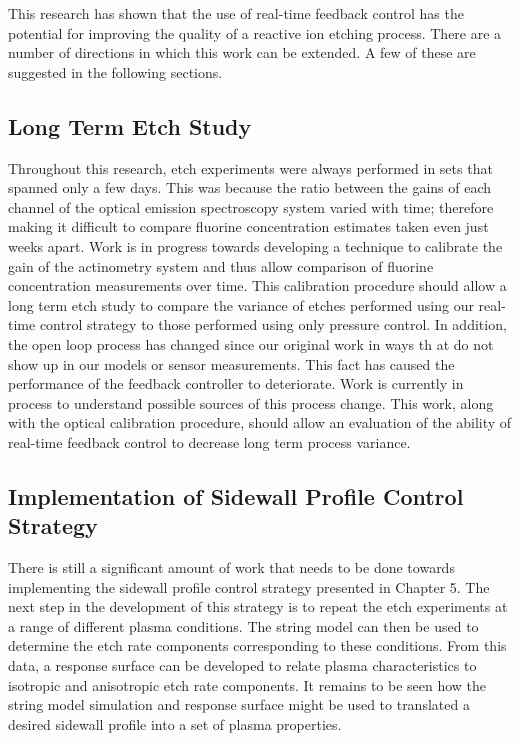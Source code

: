 \tab This research has shown that the use of real-time feedback control has the potential for
improving the quality of a reactive ion etching process. There are a number of directions
in which this work can be extended. A few of these are suggested in the following sections.

\subsection{Long Term Etch Study}

\tab Throughout this research, etch experiments were always performed in sets that spanned
only a few days. This was because the ratio between the gains of each channel of the optical
emission spectroscopy system varied with time; therefore making it difficult to compare
fluorine concentration estimates taken even just weeks apart. Work is in progress towards
developing a technique to calibrate the gain of the actinometry system and thus allow
comparison of fluorine concentration measurements over time. This calibration procedure
should allow a long term etch study to compare the variance of etches performed using
our real-time control strategy to those performed using only pressure control. In addition,
the open loop process has changed since our original work in ways th at do not show up in
our models or sensor measurements. This fact has caused the performance of the feedback
controller to deteriorate. Work is currently in process to understand possible sources of this
process change. This work, along with the optical calibration procedure, should allow an
evaluation of the ability of real-time feedback control to decrease long term process variance.


\subsection{Implementation of Sidewall Profile Control Strategy}

\tab There is still a significant amount of work that needs to be done towards implementing
the sidewall profile control strategy presented in Chapter 5. The next step in the development of this strategy is to repeat the etch experiments at a range of different plasma
conditions. The string model can then be used to determine the etch rate components
corresponding to these conditions. From this data, a response surface can be developed to
relate plasma characteristics to isotropic and anisotropic etch rate components. It remains
to be seen how the string model simulation and response surface might be used to translated
a desired sidewall profile into a set of plasma properties.

